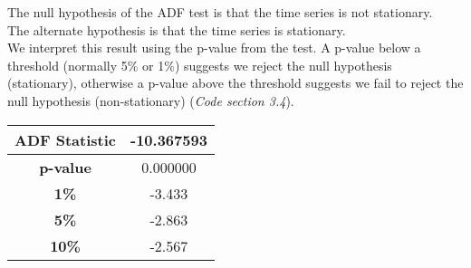 \documentclass[11pt]{article}
\begin{document}
{The null hypothesis of the ADF test is that the time series is not stationary.\\
The alternate hypothesis is that the time series is stationary.\\
We interpret this result using the p-value from the test. A p-value below a threshold (normally 5\% or 1\%) suggests we reject the null hypothesis (stationary), otherwise a p-value above the threshold suggests we fail to reject the null hypothesis (non-stationary) (\textsl{Code section 3.4}).\\
\begin{center}
	\centering
\begin{tabular}{|c|c|}
	\hline 
	\textbf{ADF Statistic}&-10.367593  \\ 
	\hline 
	\textbf{p-value}&0.000000  \\ 
	\hline 
	\textbf{1\%}&-3.433  \\ 
	\hline 
	\textbf{5\%}&-2.863  \\ 
	\hline 
	\textbf{10\%}&-2.567  \\ 
	\hline 
\end{tabular} 
\end{center}

}
\end{document}
